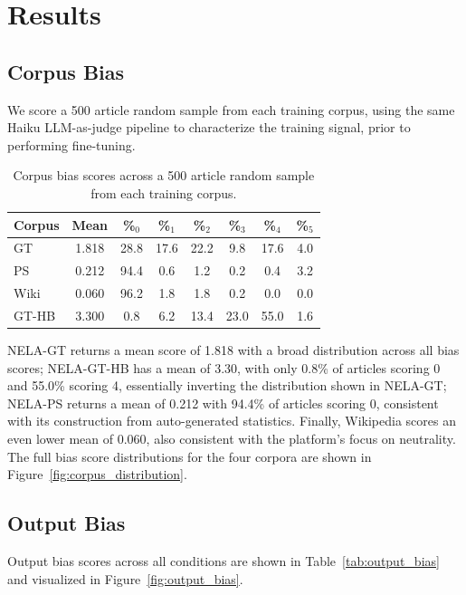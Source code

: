 \documentclass[12pt]{article}
\begin{document}
\section{Results}

\subsection{Corpus Bias}

We score a 500 article random sample from each training corpus, using the same Haiku LLM-as-judge pipeline to characterize the training signal, prior to performing fine-tuning. 

\begin{table}[htbp]
  \centering
  \caption{Corpus bias scores across a 500 article random sample from each training corpus.}
  \label{tab:corpus_bias}
  \begin{tabular}{lccccccc}
    \toprule
    Corpus & Mean & \%$_{0}$ & \%$_{1}$ & \%$_{2}$ & \%$_{3}$ & \%$_{4}$ & \%$_{5}$ \\
    \midrule
    GT     & 1.818 & 28.8 & 17.6 & 22.2 &  9.8 & 17.6 & 4.0 \\
    PS     & 0.212 & 94.4 &  0.6 &  1.2 &  0.2 &  0.4 & 3.2 \\
    Wiki   & 0.060 & 96.2 &  1.8 &  1.8 &  0.2 &  0.0 & 0.0 \\
    GT-HB  & 3.300 &  0.8 &  6.2 & 13.4 & 23.0 & 55.0 & 1.6 \\
    \bottomrule
  \end{tabular}
\end{table}

NELA-GT returns a mean score of 1.818 with a broad distribution across all bias scores; NELA-GT-HB has a mean of 3.30, with only 0.8\% of articles scoring 0 and 55.0\% scoring 4, essentially inverting the distribution shown in NELA-GT; NELA-PS returns a mean of 0.212 with 94.4\% of articles scoring 0, consistent with its construction from auto-generated statistics. Finally, Wikipedia scores an even lower mean of 0.060, also consistent with the platform's focus on neutrality.
The full bias score distributions for the four corpora are shown in Figure~\ref{fig:corpus_distribution}.

\subsection{Output Bias}

Output bias scores across all conditions are shown in Table~\ref{tab:output_bias} and visualized in Figure~\ref{fig:output_bias}.
\end{document}

